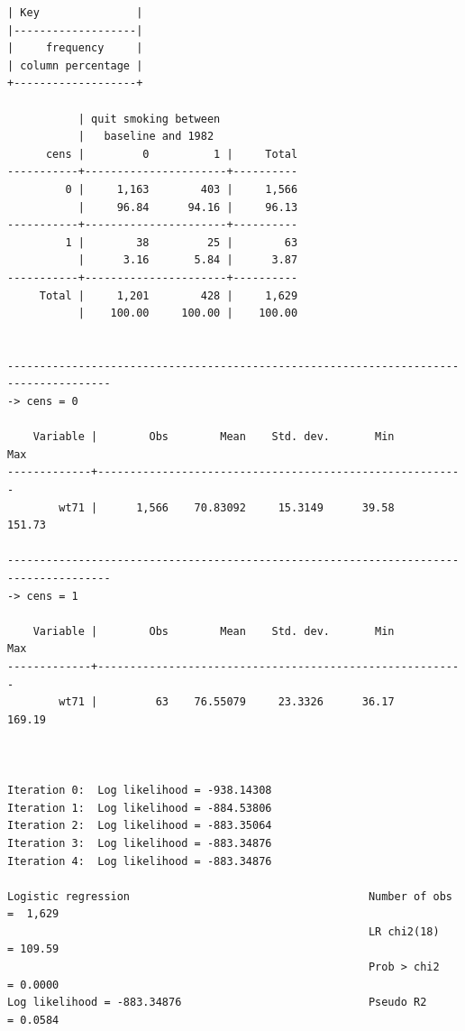 \documentclass[
  10pt,
  a4paper,
]{book}
\begin{document}
\begin{verbatim}
| Key               |
|-------------------|
|     frequency     |
| column percentage |
+-------------------+

           | quit smoking between
           |   baseline and 1982
      cens |         0          1 |     Total
-----------+----------------------+----------
         0 |     1,163        403 |     1,566 
           |     96.84      94.16 |     96.13 
-----------+----------------------+----------
         1 |        38         25 |        63 
           |      3.16       5.84 |      3.87 
-----------+----------------------+----------
     Total |     1,201        428 |     1,629 
           |    100.00     100.00 |    100.00 


--------------------------------------------------------------------------------------
-> cens = 0

    Variable |        Obs        Mean    Std. dev.       Min        Max
-------------+---------------------------------------------------------
        wt71 |      1,566    70.83092     15.3149      39.58     151.73

--------------------------------------------------------------------------------------
-> cens = 1

    Variable |        Obs        Mean    Std. dev.       Min        Max
-------------+---------------------------------------------------------
        wt71 |         63    76.55079     23.3326      36.17     169.19



Iteration 0:  Log likelihood = -938.14308  
Iteration 1:  Log likelihood = -884.53806  
Iteration 2:  Log likelihood = -883.35064  
Iteration 3:  Log likelihood = -883.34876  
Iteration 4:  Log likelihood = -883.34876  

Logistic regression                                     Number of obs =  1,629
                                                        LR chi2(18)   = 109.59
                                                        Prob > chi2   = 0.0000
Log likelihood = -883.34876                             Pseudo R2     = 0.0584


\end{verbatim}
\end{document}
